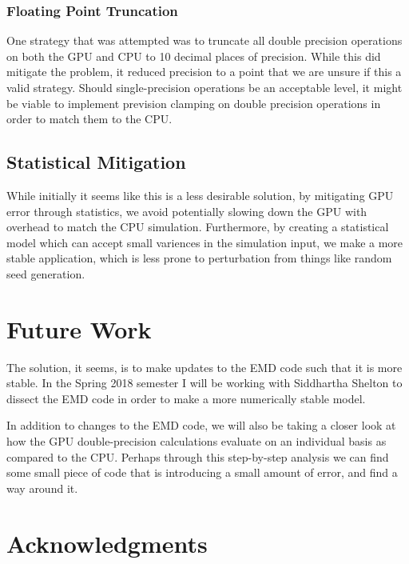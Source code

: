 \documentclass[fleqn,10pt]{SelfArx} %
\begin{document}
        \subsubsection{Floating Point Truncation}
            One strategy that was attempted was to truncate all double precision operations on both the GPU and CPU to 10 decimal places of precision. While this did mitigate the problem, it reduced precision to a point that we are unsure if this a valid strategy. Should single-precision operations be an acceptable level, it might be viable to implement prevision clamping on double precision operations in order to match them to the CPU.

        \subsection{Statistical Mitigation}
            While initially it seems like this is a less desirable solution, by mitigating GPU error through statistics, we avoid potentially slowing down the GPU with overhead to match the CPU simulation. Furthermore, by creating a statistical model which can accept small variences in the simulation input, we make a more stable application, which is less prone to perturbation from things like random seed generation.

\section{Future Work}
The solution, it seems, is to make updates to the EMD code such that it is more stable. In the Spring 2018 semester I will be working with Siddhartha Shelton to dissect the EMD code in order to make a more numerically stable model.

In addition to changes to the EMD code, we will also be taking a closer look at how the GPU double-precision calculations evaluate on an individual basis as compared to the CPU. Perhaps through this step-by-step analysis we can find some small piece of code that is introducing a small amount of error, and find a way around it.

\section*{Acknowledgments} %






\end{document}
